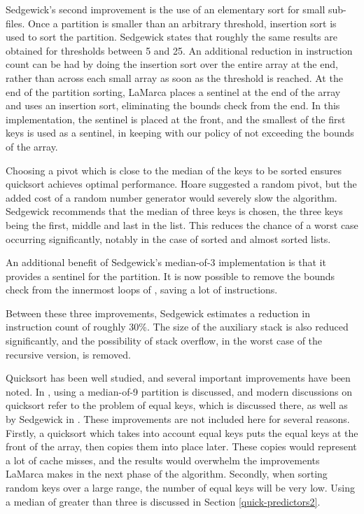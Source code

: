 Sedgewick's second improvement is the use of an elementary sort for small
sub-files.  Once a partition is smaller than an arbitrary threshold, insertion
sort is used to sort the partition. Sedgewick states that roughly the same
results are obtained for thresholds between 5 and 25. An additional reduction in
instruction count can be had by doing the insertion sort over the entire array
at the end, rather than across each small array as soon as the threshold is
reached. At the end of the partition sorting, LaMarca places a sentinel at the
end of the array and uses an insertion sort, eliminating the bounds check from
the end. In this implementation, the sentinel is placed at the front, and the
smallest of the first  keys is used as a sentinel, in keeping
with our policy of not exceeding the bounds of the array.

Choosing a pivot which is close to the median of the keys to be sorted ensures
quicksort achieves optimal performance. Hoare suggested a random pivot, but the
added cost of a random number generator would severely slow the algorithm.
Sedgewick recommends that the median of three keys is chosen, the three keys
being the first, middle and last in the list. This reduces the chance of a worst
case occurring significantly, notably in the case of sorted and almost sorted
lists.

An additional benefit of Sedgewick's median-of-3 implementation is that it
provides a sentinel for the partition. It is now possible to remove the bounds
check from the innermost loops of , saving a lot of instructions.

Between these three improvements, Sedgewick estimates a reduction in
instruction count of roughly 30\%. The size of the auxiliary stack is also
reduced significantly, and the possibility of stack overflow, in the worst case
of the recursive version, is removed.

Quicksort has been well studied, and several important improvements have been
noted. In \cite{BentleyMcIlroy93}, using a median-of-9 partition is discussed,
and modern discussions on quicksort refer to the problem of equal keys, which is
discussed there, as well as by Sedgewick in \cite{SedgewickBentley02}. These
improvements are not included here for several reasons. Firstly, a quicksort
which takes into account equal keys puts the equal keys at the front of the
array, then copies them into place later. These copies would represent a lot of
cache misses, and the results would overwhelm the improvements LaMarca makes in
the next phase of the algorithm. Secondly, when sorting random keys over a
large range, the number of equal keys will be very low. Using a median of
greater than three is discussed in Section \ref{quick-predictors2}.

